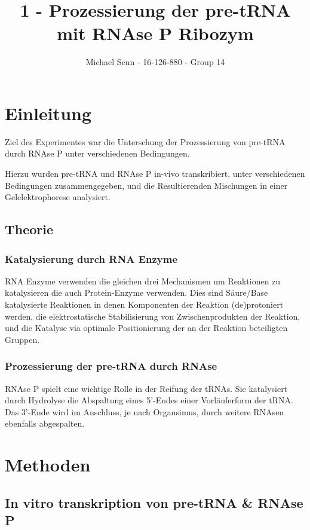 \documentclass[a4paper,english]{scrreprt}
\title{1 - Prozessierung der pre-tRNA mit RNAse P Ribozym}
\author{Michael Senn \maillink{michael.senn@students.unibe.ch} - 16-126-880 - Group 14}
\date{\printdate}
\begin{document}
\maketitle

\chapter{Einleitung}

Ziel des Experimentes war die Unterschung der Prozessierung von pre-tRNA durch
RNAse P unter verschiedenen Bedingungen.

Hierzu wurden pre-tRNA und RNAse P in-vivo transkribiert, unter verschiedenen
Bedingungen zusammengegeben, und die Resultierenden Mischungen in einer
Gelelektrophorese analysiert.

\section{Theorie}

\subsection{Katalysierung durch RNA Enzyme}

RNA Enzyme verwenden die gleichen drei Mechanismen um Reaktionen zu
katalysieren die auch Protein-Enzyme verwenden. Dies sind Säure/Base
katalysierte Reaktionen in denen Komponenten der Reaktion (de)protoniert
werden, die elektrostatische Stabilisierung von Zwischenprodukten der Reaktion,
und die Katalyse via optimale Positionierung der an der Reaktion beteiligten
Gruppen.

\subsection{Prozessierung der pre-tRNA durch RNAse}

RNAse P spielt eine wichtige Rolle in der Reifung der tRNAs. Sie katalysiert
durch Hydrolyse die Abspaltung eines 5'-Endes einer Vorläuferform der tRNA. Das
3'-Ende wird im Anschluss, je nach Organsimus, durch weitere RNAsen ebenfalls
abgespalten.

\chapter{Methoden}

\section{In vitro transkription von pre-tRNA \& RNAse P}
\end{document}
